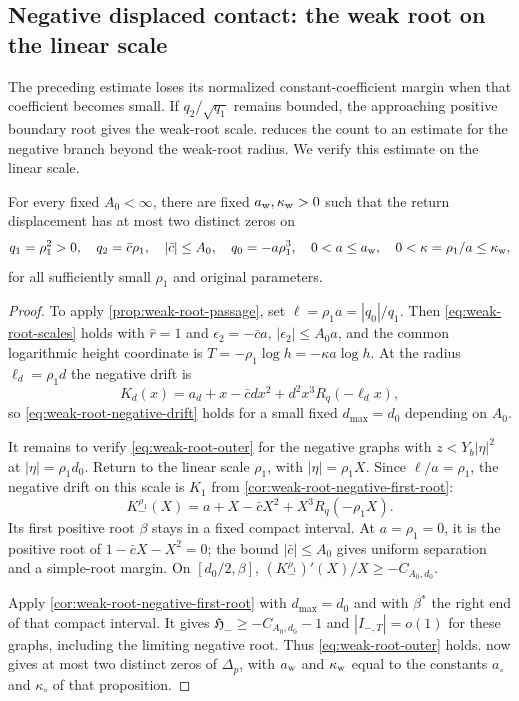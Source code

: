 \subsection{Negative displaced contact: the weak root on the linear scale}
\label{sec:direct-negative-displaced}

The preceding estimate loses its normalized constant-coefficient
margin when that coefficient becomes small. If
\(q_2/\sqrt{q_1}\) remains bounded, the approaching positive boundary
root gives the weak-root scale.  reduces
the count to an estimate for the negative branch beyond the weak-root
radius. We verify this estimate on the linear scale.

\begin{proposition}
\label{prop:direct-negative-displaced}
For every fixed \(A_0<\infty\), there are fixed
\(a_{\rm w},\kappa_{\rm w}>0\) such that the return displacement has
at most two distinct zeros on
\[
 q_1=\rho_1^2>0,\quad q_2=\bar c\rho_1,\quad |\bar c|\le A_0,\quad
 q_0=-a\rho_1^3,\quad 0<a\le a_{\rm w},\quad
 0<\kappa=\rho_1/a\le\kappa_{\rm w} ,
\]
for all sufficiently small \(\rho_1\) and original parameters.
\end{proposition}

\begin{proof}
To apply \cref{prop:weak-root-passage}, set
\(\ell=\rho_1a=|q_0|/q_1\). Then
\eqref{eq:weak-root-scales} holds with \(\hat r=1\) and
\(\epsilon_2=-\bar c a\), \(|\epsilon_2|\le A_0a\), and the common
logarithmic height coordinate is \(T=-\rho_1\log h=-\kappa a\log h\).
At the radius \(\ell_d=\rho_1d\) the negative drift is
\[
 K_d(x)=a_d+x-\bar c dx^2+d^2x^3R_q(-\ell_dx),
\]
so \eqref{eq:weak-root-negative-drift} holds for a small fixed
\(d_{\max}=d_0\) depending on \(A_0\).

It remains to verify \eqref{eq:weak-root-outer} for the negative graphs
with \(z<Y_b|\eta|^2\) at \(|\eta|=\rho_1d_0\). Return to the linear
scale \(\rho_1\), with \(|\eta|=\rho_1X\). Since \(\ell/a=\rho_1\),
the negative drift on this scale is \(K_1\) from
\cref{cor:weak-root-negative-first-root}:
\[
 K_-^{\rho_1}(X)=a+X-\bar c X^2+X^3R_q(-\rho_1 X).
\]
Its first positive root \(\beta\) stays in a fixed compact interval.
At \(a=\rho_1=0\), it is the positive root of
\(1-\bar c X-X^2=0\); the bound \(|\bar c|\le A_0\) gives uniform
separation and a simple-root margin. On \([d_0/2,\beta]\),
\((K_-^{\rho_1})'(X)/X\ge-C_{A_0,d_0}\).

Apply \cref{cor:weak-root-negative-first-root} with
\(d_{\max}=d_0\) and with \(\beta^*\) the right end of that compact
interval. It gives \(\mathfrak H_-\ge-C_{A_0,d_0}-1\) and
\(|I_{-,T}|=o(1)\) for these graphs, including the limiting negative
root. Thus \eqref{eq:weak-root-outer} holds.
 now gives at most two distinct zeros
of \(\Delta_p\), with \(a_{\rm w}\) and \(\kappa_{\rm w}\) equal to
the constants \(a_\circ\) and \(\kappa_\circ\) of that proposition.
\end{proof}
